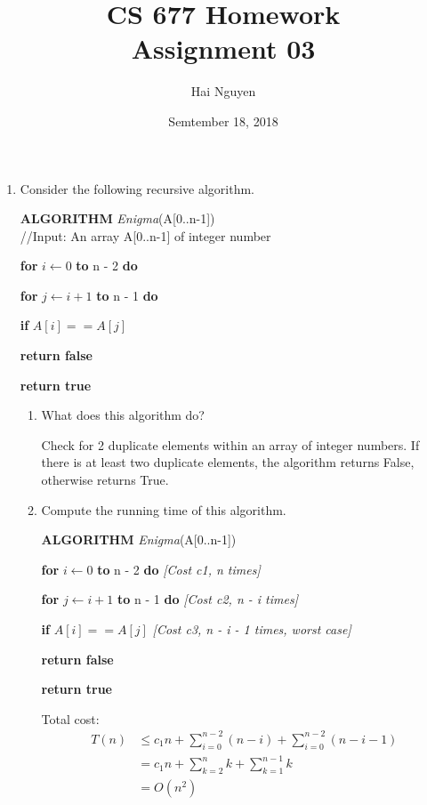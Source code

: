 \documentclass[11pts]{report}
\title{CS 677 Homework \\ Assignment 03}
\date{Semtember 18, 2018}
\author{Hai Nguyen}
\begin{document}
\maketitle

\begin{enumerate}

\item Consider the following recursive algorithm.

\textbf{ALGORITHM} \textit{Enigma}(A[0..n-1])
\\//Input: An array A[0..n-1] of integer number
\par \textbf{for} $i \gets 0$ \textbf{to} n - 2 \textbf{do}
\par \quad \textbf{for} $j \gets i+1$ \textbf{to} n - 1 \textbf{do}
\par \quad \quad \textbf{if} $A[i] == A[j]$
\par \quad \quad \quad \textbf{return false}
\par \textbf{return true}

\begin{enumerate}

\item What does this algorithm do?
\par Check for 2 duplicate elements within an array of integer numbers. If there is at least two duplicate elements, the algorithm returns False, otherwise returns True.

\item Compute the running time of this algorithm.

\textbf{ALGORITHM} \textit{Enigma}(A[0..n-1])
\par \textbf{for} $i \gets 0$ \textbf{to} n - 2 \textbf{do} \textit{[Cost c1, n times]}
\par \quad \textbf{for} $j \gets i+1$ \textbf{to} n - 1 \textbf{do} \textit{[Cost c2, n - i times]}
\par \quad \quad \textbf{if} $A[i] == A[j]$ \textit{[Cost c3, n - i - 1 times, worst case]}
\par \quad \quad \quad \textbf{return false}
\par \textbf{return true}
\par Total cost:
\begin{align*}
T(n) &\leq c_1n + \sum_{i=0}^{n-2}(n-i) + \sum_{i=0}^{n-2}(n-i-1) \\
	 &= c_1n + \sum_{k=2}^{n}k + \sum_{k=1}^{n-1}k \\
	 &= O(n^2)
\end{align*}
\end{enumerate}


\end{enumerate}
\end{document}
